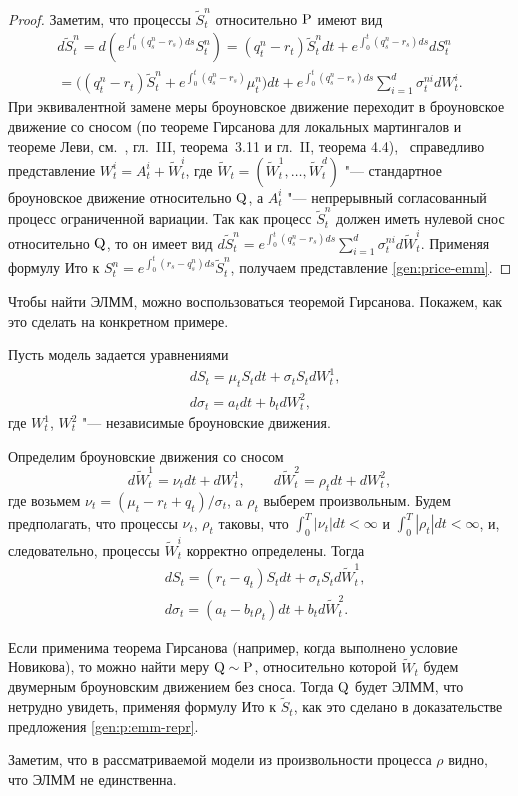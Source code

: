\begin{proof}
Заметим, что процессы $\tilde S_t^n$ относительно $\P$ имеют вид
\begin{multline*}
d\tilde S_t^n = d(e^{\int_0^t (q_s^n-r_s) ds}S_t^n) = (q_t^n-r_t)\tilde S_t^n dt + 
e^{\int_0^t (q_s^n-r_s) ds} dS_t^n \\ = 
\bigl((q_t^n-r_t)\tilde S_t^n + e^{\int_0^t (q_s^n-r_s)} \mu_t^n\bigr) dt + 
e^{\int_0^t (q_s^n-r_s) ds} \sum_{i=1}^d \sigma_t^{ni} d W_t^i.
\end{multline*}
При эквивалентной замене меры броуновское движение переходит в броуновское движение со сносом (по теореме Гирсанова для локальных мартингалов и теореме Леви, см.\ \cite{JacodShiryaev94}, гл.~III, теорема~3.11 и гл.~II, теорема 4.4), \te\ справедливо представление $W_t^i = A_t^i + \tilde W_t^i$, где $\tilde W_t = (\tilde W_t^1,\dots,\tilde W_t^d)$ "--- стандартное броуновское движение относительно $\Q$, а $A_t^i$ "--- непрерывный согласованный процесс ограниченной вариации.
Так как процесс $\tilde S_t^n$ должен иметь нулевой снос относительно $\Q$, то он имеет вид $d\tilde S_t^n = e^{\int_0^t (q_s^n-r_s) ds} \sum_{i=1}^d \sigma_t^{ni} d\tilde W_t^i$. 
Применяя формулу Ито к $S_t^n = e^{\int_0^t (r_s-q_s^n) ds} \tilde S_t^n$, получаем представление \eqref{gen:price-emm}.
\end{proof}

Чтобы найти ЭЛММ, можно воспользоваться теоремой Гирсанова.
Покажем, как это сделать на конкретном примере.

\begin{example}
Пусть модель задается уравнениями
\begin{align*}
&d S_t = \mu_t S_t dt + \sigma_t S_t d W^1_t,\\
& d \sigma_t = a_t dt + b_t d W^2_t,
\end{align*}
где $W_t^1$, $W_t^2$ "--- независимые броуновские движения. 

Определим броуновские движения со сносом
\[
d \tilde W_t^1 = \nu_t dt + dW_t^1, \qquad d \tilde W_t^2 = \rho_t dt + d W_t^2,
\]
где возьмем $\nu_t = (\mu_t - r_t+q_t)/\sigma_t$, a $\rho_t$ выберем произвольным.
Будем предполагать, что процессы $\nu_t$, $\rho_t$ таковы, что $\int_0^T |\nu_t| dt < \infty$ и $\int_0^T|\rho_t|dt < \infty$, и, следовательно, процессы $\tilde W_t^i$ корректно определены.
Тогда
\begin{align*}
&d S_t = (r_t-q_t) S_t dt + \sigma_t S_t d \tilde W^1_t,\\
& d \sigma_t = (a_t -b_t\rho_t) dt + b_t d \tilde W^2_t.
\end{align*}

Если применима теорема Гирсанова (например, когда выполнено условие Новикова), то можно найти меру $\Q\sim\P$, относительно которой $\tilde W_t$ будем двумерным броуновским движением без сноса.
Тогда $\Q$ будет ЭЛММ, что нетрудно увидеть, применяя формулу Ито к $\tilde S_t$, как это сделано в доказательстве предложения \ref{gen:p:emm-repr}.

Заметим, что в рассматриваемой модели из произвольности процесса $\rho$ видно, что ЭЛММ не единственна.
\end{example}


